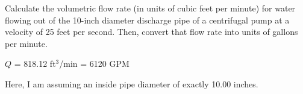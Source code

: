 

Calculate the volumetric flow rate (in units of cubic feet per minute) for water flowing out of the 10-inch diameter discharge pipe of a centrifugal pump at a velocity of 25 feet per second.  Then, convert that flow rate into units of gallons per minute.







$Q$ = 818.12 ft$^{3}$/min = 6120 GPM







Here, I am assuming an inside pipe diameter of exactly 10.00 inches.




